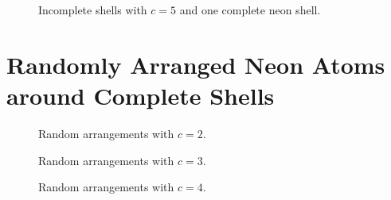 \begin{figure}
    \centering
    
    \caption{Incomplete shells with $c=5$ and one complete neon shell.}
    \label{incompl01-core05}
\end{figure}



\section{Randomly Arranged Neon Atoms around Complete Shells}
\begin{figure}[h]
    \centering
    
    \caption{Random arrangements with $c=2$.}
    \label{random-core02}
\end{figure}

\begin{figure}
    \centering
    
    \caption{Random arrangements with $c=3$.}
    \label{random-core03}
\end{figure}

\begin{figure}[h]
    \centering
    
    \caption{Random arrangements with $c=4$.}
    \label{random-core04}
\end{figure}
